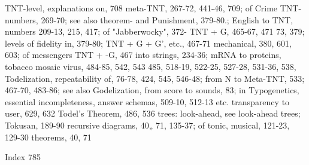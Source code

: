 TNT-level, explanations on, 708                  meta-TNT, 267-72, 441-46, 709; of Crime
TNT-numbers, 269-70; see also theorem-           and Punishment, 379-80.; English to TNT,
numbers                                          209-13, 215, 417; of "Jabberwocky", 372-
TNT + G, 465-67, 471                             73, 379; levels of fidelity in, 379-80;
TNT + G + G', etc., 467-71                       mechanical, 380, 601, 603; of messengers
TNT + -G, 467                                    into strings, 234-36; mRNA to proteins,
tobacco mosaic virus, 484-85, 542, 543           485, 518-19, 522-25, 527-28, 531-36, 538,
Todelization, repeatability of, 76-78, 424,      545, 546-48; from N to Meta-TNT, 533;
467-70, 483-86; see also Godelization,           from score to sounds, 83; in Typogenetics,
essential incompleteness, answer schemas,        509-10, 512-13
etc.                                             transparency to user, 629, 632
Todel's Theorem, 486, 536                        trees: look-ahead, see look-ahead trees;
Tokusan, 189-90                                  recursive diagrams, 40„ 71, 135-37; of
tonic, musical, 121-23, 129-30                   theorems, 40, 71




Index                                                                                      785

